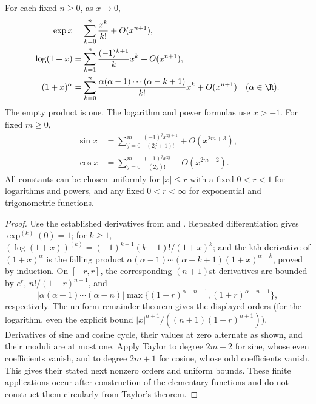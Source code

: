 \begin{proposition}
For each fixed $n\ge0$, as $x\to0$,
\begin{align*}
\exp x&=\sum_{k=0}^n\frac{x^k}{k!}+O(x^{n+1}),\\
\log(1+x)&=\sum_{k=1}^n\frac{(-1)^{k+1}}k x^k+O(x^{n+1}),\\
(1+x)^\alpha&=\sum_{k=0}^n\frac{\alpha(\alpha-1)\cdots(\alpha-k+1)}{k!}x^k+O(x^{n+1})\quad(\alpha\in\R).
\end{align*}
The empty product is one. The logarithm and power formulas use $x>-1$. For fixed $m\ge0$,
\begin{align*}
\sin x&=\sum_{j=0}^m\frac{(-1)^jx^{2j+1}}{(2j+1)!}+O(x^{2m+3}),\\
\cos x&=\sum_{j=0}^m\frac{(-1)^jx^{2j}}{(2j)!}+O(x^{2m+2}).
\end{align*}
All constants can be chosen uniformly for $|x|\le r$ with a fixed $0<r<1$ for logarithms and powers, and any fixed $0<r<\infty$ for exponential and trigonometric functions.
\end{proposition}
\begin{proof}
Use the established derivatives from  and . Repeated differentiation gives $\exp^{(k)}(0)=1$; for $k\ge1$, $(\log(1+x))^{(k)}=(-1)^{k-1}(k-1)!/(1+x)^k$; and the kth derivative of $(1+x)^\alpha$ is the falling product $\alpha(\alpha-1)\cdots(\alpha-k+1)(1+x)^{\alpha-k}$, proved by induction. On $[-r,r]$, the corresponding $(n+1)$st derivatives are bounded by $e^r$, $n!/(1-r)^{n+1}$, and
\[ |\alpha(\alpha-1)\cdots(\alpha-n)|\max\{(1-r)^{\alpha-n-1},(1+r)^{\alpha-n-1}\}, \]
respectively. The uniform remainder theorem gives the displayed orders (for the logarithm, even the explicit bound $|x|^{n+1}/((n+1)(1-r)^{n+1})$). Derivatives of sine and cosine cycle, their values at zero alternate as shown, and their moduli are at most one. Apply Taylor to degree $2m+2$ for sine, whose even coefficients vanish, and to degree $2m+1$ for cosine, whose odd coefficients vanish. This gives their stated next nonzero orders and uniform bounds. These finite applications occur after construction of the elementary functions and do not construct them circularly from Taylor's theorem.
\end{proof}

